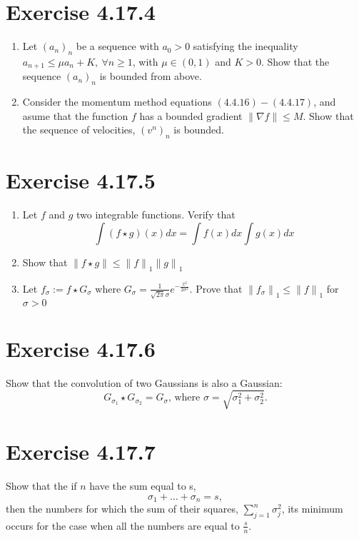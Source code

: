 \documentclass{exam}
\begin{document}
\section*{Exercise 4.17.4}
\begin{enumerate}
   \item Let $(a_n)_{n}$ be a sequence with $a_0 > 0$ satisfying the inequality \\
   $a_{n+1} \leq \mu a_n + K, \ \forall n \geq 1$, with $\mu \in (0,1)$ and $K > 0$. Show that the sequence $(a_n)_{n}$ is bounded from above.
   \item Consider the momentum method equations $(4.4.16)-(4.4.17)$, and asume that the function $f$ has a bounded gradient $\lVert \nabla f \lVert \leq M$. Show that the 
   sequence of velocities, $(v^n)_{n}$ is bounded.
\end{enumerate}

\section*{Exercise 4.17.5}
\begin{enumerate}
   \item  Let $f$ and $g$ two integrable functions. Verify that
            \begin{equation*}
                \int (f \star g) (x) d x  = \displaystyle \int f(x) d x \displaystyle \int g(x) d x 
            \end{equation*}

    \item Show that $\lVert f \star g \lVert \leq {\lVert f \lVert}_{1} {\lVert g \lVert}_{1}$
    \item Let $f_{\sigma} := f \star G_{\sigma}$ where $G_{\sigma} = \frac{1}{\sqrt{2\pi}\sigma}e^{-\frac{x^{2}}{2\sigma^{2}}}$. Prove that ${\lVert f_{\sigma}\lVert}_{1} \leq {\lVert f \lVert}_{1}$ for $\sigma > 0$
\end{enumerate}

\section*{Exercise 4.17.6}
Show that the convolution of two Gaussians is also a Gaussian:\\
\begin{equation*}
    G_{\sigma_{1}} \star G_{\sigma_{2}} = G_{\sigma} \text{, where } \sigma = \sqrt{\sigma_1^{2} + \sigma_2^{2}}.
\end{equation*}

\section*{Exercise 4.17.7}
Show that the if $n$ have the sum equal to s,
\begin{equation*}
    \sigma_{1} + \ldots + \sigma_{n} = s,
\end{equation*}
then the numbers for which the sum of their squares, $\sum_{j=1}^{n} \sigma_{j}^{2}$, its minimum occurs for the case when all the numbers are equal to $\frac{s}{n}.$
\end{document}
